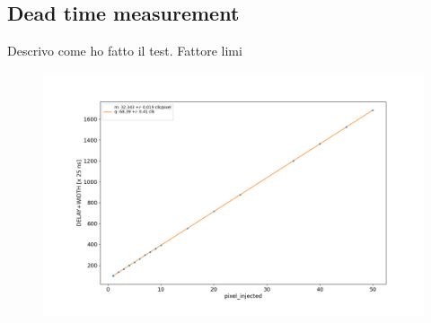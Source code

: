     
    \subsection{Dead time measurement}
    Descrivo come ho fatto il test. 
    Fattore limi
    \begin{figure}[h!]
            \centering
            \includegraphics[width=.7\linewidth]{figures/Monopix1/dead_time.png}
            \caption{}
            \label{fig:dead_time}
        \end{figure}

    
